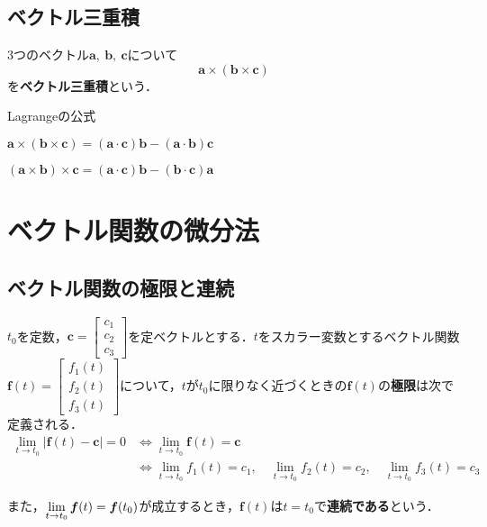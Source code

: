 \subsection{ベクトル三重積}

3つのベクトル$\bm{a},\ \bm{b},\ \bm{c}$について
\begin{equation}
	\bm{a} \times (\bm{b} \times \bm{c})
\end{equation}
を\textbf{ベクトル三重積}という．

\begin{kousiki}{Lagrangeの公式}
	\begin{enumerate}[label=\textbf{[\arabic*]}, labelsep=10pt, leftmargin=23pt]
		\item $\bm{a} \times (\bm{b} \times \bm{c}) = (\bm{a} \cdot \bm{c})\bm{b} - (\bm{a} \cdot \bm{b})\bm{c}$
		\item $(\bm{a} \times \bm{b}) \times \bm{c} = (\bm{a} \cdot \bm{c})\bm{b} - (\bm{b} \cdot \bm{c})\bm{a}$
	\end{enumerate}
\end{kousiki}



\section{ベクトル関数の微分法}
\subsection{ベクトル関数の極限と連続}

$t_0$を定数，$\bm{c} = 
\begin{bmatrix}
	c_1\\ c_2\\ c_3
\end{bmatrix}
$を定ベクトルとする．$t$をスカラー変数とするベクトル関数$\bm{f}(t) = 
\begin{bmatrix}
	f_1(t)\\ f_2(t)\\ f_3(t)
\end{bmatrix}
$について，$t$が$t_0$に限りなく近づくときの$\bm{f}(t)$の\textbf{極限}は次で定義される．
\begin{align}
	\lim_{t \to t_0} |\bm{f}(t) - \bm{c}| = 0 &\iff \lim_{t \to t_0} \bm{f}(t) = \bm{c}\\
	&\iff \lim_{t \to t_0} f_1(t) = c_1,\quad \lim_{t \to t_0} f_2(t) = c_2,\quad \lim_{t \to t_0} f_3(t) = c_3
\end{align}

また，$\lim\limits_{t \to t_0} \bm{f}(t) = \bm{f}(t_0)$が成立するとき，$\bm{f}(t)$は$t = t_0$で\textbf{連続である}という．



